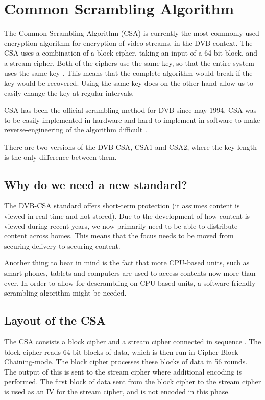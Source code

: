 \chapter{Common Scrambling Algorithm} \label{ch:CSA}
The Common Scrambling Algorithm (CSA) is currently the most commonly 
used encryption algorithm for encryption of video-streams, in the DVB 
context. The CSA uses a combination of a block cipher, taking an input 
of a 64-bit block, and a stream cipher. Both of the ciphers use the 
same key, so that the entire system uses the same key 
\citep[pp. 271--272]{WeiLi:2007}. This means that the complete 
algorithm would break if the key would be recovered. Using the same key 
does on the other hand allow us to easily change the key at regular 
intervals. 

CSA has been the official scrambling method for DVB since may 1994. CSA 
was to be easily implemented in hardware and hard to implement in 
software to make reverse-engineering of the algorithm difficult 
\citep{DVBScene:2013}.


There are two versions of the DVB-CSA, CSA1 and CSA2, where the
key-length is the only difference between them. 
\citep[p. 23]{DVBScene:2013}

\section{Why do we need a new standard?}
The DVB-CSA standard offers short-term protection (it assumes content 
is viewed in real time and not stored). Due to the development of how 
content is viewed during recent years, we now primarily need to be able 
to distribute content across homes. This means that the focus needs to 
be moved from securing delivery to securing content. \citep{Farncombe}

Another thing to bear in mind is the fact that more CPU-based units, 
such as smart-phones, tablets and computers are used to access contents 
now more than ever. In order to allow for descrambling on CPU-based 
units, a software-friendly scrambling algorithm might be needed.

\section{Layout of the CSA}
The CSA consists a block cipher and a stream cipher connected in 
sequence \citep[p. 271]{WeiLi:2007}. The block cipher reads 64-bit 
blocks of data, which is then run in Cipher Block Chaining-mode. The 
block cipher processes these blocks of data in 56 rounds. The output of 
this is sent to the stream cipher where additional encoding is 
performed. The first block of data sent from the block cipher to the 
stream cipher is used as an IV for the stream cipher, and is not 
encoded in this phase. \citep{DVBAnalysis:2006}


